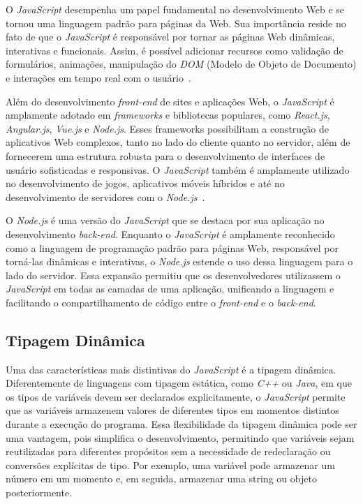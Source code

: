 O \textit{JavaScript} desempenha um papel fundamental no desenvolvimento Web e se tornou uma linguagem padrão para páginas da Web. Sua importância reside no fato de que o \textit{JavaScript} é responsável por tornar as páginas Web dinâmicas, interativas e funcionais. Assim, é possível adicionar recursos como validação de formulários, animações, manipulação do \textit{DOM} (Modelo de Objeto de Documento) e interações em tempo real com o usuário~\cite{javascript-rockcontent}.

Além do desenvolvimento \textit{front-end} de sites e aplicações Web, o \textit{JavaScript} é amplamente adotado em \textit{frameworks} e bibliotecas populares, como \textit{React.js}, \textit{Angular.js},  \textit{Vue.js} e \textit{Node.js}. Esses frameworks possibilitam a construção de aplicativos Web complexos, tanto no lado do cliente quanto no servidor, além de fornecerem uma estrutura robusta para o desenvolvimento de interfaces de usuário sofisticadas e responsivas. O \textit{JavaScript} também é amplamente utilizado no desenvolvimento de jogos, aplicativos móveis híbridos e até no desenvolvimento de servidores com o \textit{Node.js}~\cite{javascript_mdn}.

O \textit{Node.js} é uma versão do \textit{JavaScript} que se destaca por sua aplicação no desenvolvimento \textit{back-end}. Enquanto o \textit{JavaScript} é amplamente reconhecido como a linguagem de programação padrão para páginas Web, responsável por torná-las dinâmicas e interativas, o \textit{Node.js} estende o uso dessa linguagem para o lado do servidor. Essa expansão permitiu que os desenvolvedores utilizassem o \textit{JavaScript} em todas as camadas de uma aplicação, unificando a linguagem e facilitando o compartilhamento de código entre o \textit{front-end} e o \textit{back-end}.

\subsection{Tipagem Dinâmica}

Uma das características mais distintivas do \textit{JavaScript} é a tipagem dinâmica. Diferentemente de linguagens com tipagem estática, como \textit{C++} ou \textit{Java}, em que os tipos de variáveis devem ser declarados explicitamente, o \textit{JavaScript} permite que as variáveis armazenem valores de diferentes tipos em momentos distintos durante a execução do programa. Essa flexibilidade da tipagem dinâmica pode ser uma vantagem, pois simplifica o desenvolvimento, permitindo que variáveis sejam reutilizadas para diferentes propósitos sem a necessidade de redeclaração ou conversões explícitas de tipo. Por exemplo, uma variável pode armazenar um número em um momento e, em seguida, armazenar uma string ou objeto posteriormente.


